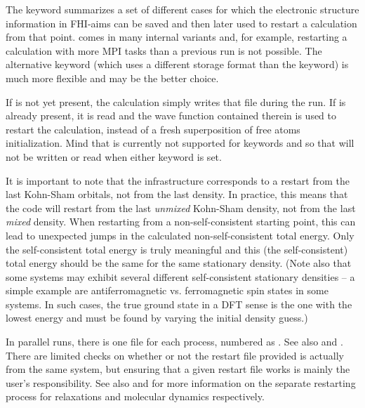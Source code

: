 The  keyword summarizes a set of different cases for
which the electronic structure information in FHI-aims can be saved
and then later used to restart a calculation from that
point.   comes in many internal variants and, for
example, restarting a 
calculation with more MPI tasks than a previous run is not
possible. The alternative  keyword (which uses
a different storage format than the  keyword) is much
more flexible and may be the better choice.

If  is not yet present, the calculation simply writes
that file during the run. If  is already present, it is
read and the wave function contained therein is used to restart the
calculation, instead of a fresh superposition of free atoms
initialization. Mind that  is currently not supported for
keywords  and 
so that  will not be written or read when either keyword is
set.

It is important to note that the  infrastructure
corresponds to a restart from the last Kohn-Sham orbitals, not from
the last density. In practice, this means that the code will restart
from the last \emph{unmixed} Kohn-Sham density, not from the last
\emph{mixed} density. When restarting from a non-self-consistent
starting point, this can lead to unexpected jumps in the calculated
non-self-consistent total energy. Only the
self-consistent total energy is truly meaningful and this (the
self-consistent) total energy should be the same for the same
stationary density. (Note also that some systems may exhibit several
different self-consistent stationary densities -- a simple example are
antiferromagnetic vs. ferromagnetic spin states in some systems. In
such cases, the true ground state in a DFT sense is the one with the
lowest energy and must be found by varying the initial density guess.)

In parallel runs, there is one file for each process, numbered
as . See also 
and . There are limited checks on
whether or not the restart file provided is actually from the same
system, but ensuring that a given restart file works is mainly the
user's responsibility. See also 
and  for more information on the separate restarting process for
relaxations and molecular dynamics respectively.

